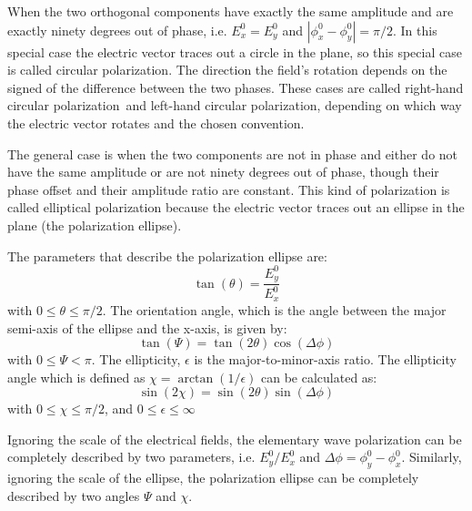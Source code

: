 When the two orthogonal components have exactly the same amplitude and are exactly ninety degrees out of phase, i.e. $E_x^0=E_y^0$ and $ | \phi_x^0 - \phi_y^0 | = \pi/2$. 
In this special case the electric vector traces out a circle in the plane, so this special case is called circular polarization. 
The direction the field's rotation depends on the signed of the difference between the two phases. 
These cases are called right-hand circular polarization and left-hand circular polarization, 
	depending on which way the electric vector rotates and the chosen convention.

The general case is when the two components are not in phase 
	and either do not have the same amplitude or are not ninety degrees out of phase, 
	though their phase offset and their amplitude ratio are constant.
This kind of polarization is called elliptical polarization because the electric vector traces out an ellipse in the plane (the polarization ellipse). 

The parameters that describe the polarization ellipse are:
\begin{equation}
\tan (\theta ) = \frac{E_y^0}{E_x^0}
\end{equation}
with
	$0 \leq \theta \leq \pi/2$. 
The orientation angle, which is the angle between the major semi-axis of the ellipse and the x-axis, is given by:
\begin{equation}
\tan (\Psi) = \tan (2 \theta) \cos(\Delta \phi)
\end{equation}
with
	$0 \leq \Psi < \pi$. 
The ellipticity, $\epsilon$ is the major-to-minor-axis ratio.
The ellipticity angle which is defined as $\chi = \arctan (1/\epsilon)$ can be calculated as:
\begin{equation}
\sin (2 \chi) = \sin(2 \theta) \sin( \Delta \phi)
\end{equation}
with
	$0 \leq \chi \leq \pi/2$, and $0 \leq \epsilon \leq \infty$

Ignoring the scale of the electrical fields, the elementary wave polarization can be completely described by two parameters, i.e. $E_y^0/E_x^0$ and $\Delta \phi = \phi_y^0 - \phi_x^0$. 
Similarly, ignoring the scale of the ellipse, the polarization ellipse can be completely described by two angles $\Psi$ and $\chi$.


